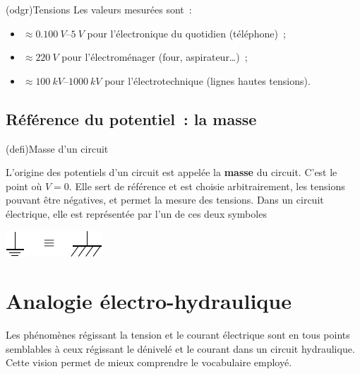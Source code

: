 \documentclass[../../main/main.tex]{subfiles}
\begin{document}
\begin{tcb}[label=odgr:tensions](odgr){Tensions}
	Les valeurs mesurées sont~:

	\begin{itemize}
		\item $\approx \SIrange{0.100}{5}{V}$ pour l'électronique du
		      quotidien (téléphone)~;
		\item $\approx \SI{220}{V}$ pour l'électroménager (four,
		      aspirateur…)~;
		\item $\approx \SIrange{100}{1000}{kV}$ pour l'électrotechnique
		      (lignes hautes tensions).
	\end{itemize}

\end{tcb}

\subsection{Référence du potentiel~: la masse}

\begin{tcb}[label=def:masse, sidebyside](defi){Masse d'un circuit}

	L'origine des potentiels d'un circuit est appelée la \textbf{masse} du
	circuit. C'est le point où $V = 0$. Elle sert de référence et est
	choisie arbitrairement, les tensions pouvant être négatives, et permet
	la mesure des tensions.
	\tcblower
	Dans un circuit électrique, elle est représentée par l'un de ces deux
	symboles
	\begin{center}
		\includegraphics[width=\linewidth]{masse}
	\end{center}
\end{tcb}

\section{Analogie électro-hydraulique}

Les phénomènes régissant la tension et le courant électrique sont en tous points
semblables à ceux régissant le dénivelé et le courant dans un circuit
hydraulique. Cette vision permet de mieux comprendre le vocabulaire employé.
\end{document}
